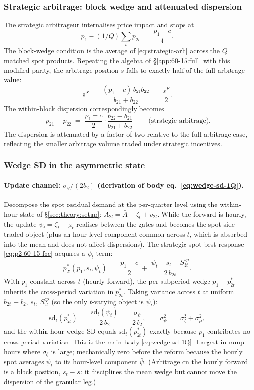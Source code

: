 \documentclass[11pt,a4paper]{article}
\theoremstyle{definition}
\theoremstyle{remark}
\theoremstyle{plain}
\begin{document}
\subsubsection{Strategic arbitrage: block wedge and attenuated dispersion}\label{app:60-15:strategic}
The strategic arbitrageur internalises price impact and stops at
\[
p_1 - (1/Q)\sum_t p_{2t} \;=\; \frac{p_1 - c}{4}.
\]
The block-wedge condition is the average of \eqref{eq:strategic-arb} across the $Q$ matched spot products. Repeating the algebra of \S\ref{app:60-15:full} with this modified parity, the arbitrage position $\bar s$ falls to exactly half of the full-arbitrage value:
\[
\bar s^{S} \;=\; \frac{(p_1 - c)\, b_{21} b_{22}}{b_{21} + b_{22}} \;=\; \frac{\bar s^{F}}{2}.
\]
The within-block dispersion correspondingly becomes
\begin{equation}
\boxed{\;p_{21} - p_{22} \;=\; \frac{p_1 - c}{2}\cdot\frac{b_{22} - b_{21}}{b_{21} + b_{22}}\;}\qquad\text{(strategic arbitrage)}.
\label{eq:within-block-strategic}
\end{equation}
The dispersion is attenuated by a factor of two relative to the full-arbitrage case, reflecting the smaller arbitrage volume traded under strategic incentives.

\subsubsection{Wedge SD in the asymmetric state}\label{app:60-15:wedgesd}

\paragraph{Update channel: $\sigma_\psi/(2 b_2)$ (derivation of body eq.~\ref{eq:wedge-sd-1Q}).} Decompose the spot residual demand at the per-quarter level using the within-hour state of \S\ref{sec:theory:setup}: $A_{2t} = \bar A + \zeta_t + v_{2t}$. While the forward is hourly, the update $\psi_t = \zeta_t + \mu_t$ realises between the gates and becomes the spot-side traded object (plus an hour-level component common across $t$, which is absorbed into the mean and does not affect dispersions). The strategic spot best response \eqref{eq:p2-60-15-foc} acquires a $\psi_t$ term:
\[
p_{2t}^*(p_1, s_t, \psi_t) \;=\; \frac{p_1 + c}{2} \;+\; \frac{\psi_t + s_t - S^{op}_{2t}}{2\, b_{2t}}.
\]
With $p_1$ constant across $t$ (hourly forward), the per-subperiod wedge $p_1 - p_{2t}^*$ inherits the cross-period variation in $p_{2t}^*$. Taking variance across $t$ at uniform $b_{2t} \equiv b_2$, $s_t$, $S^{op}_{2t}$ (so the only $t$-varying object is $\psi_t$):
\[
\mathrm{sd}_t(p_{2t}^*) \;=\; \frac{\mathrm{sd}_t(\psi_t)}{2\, b_2} \;=\; \frac{\sigma_\psi}{2\, b_2}, \qquad \sigma_\psi^2 \;=\; \sigma_\zeta^2 + \sigma_\mu^2,
\]
and the within-hour wedge SD equals $\mathrm{sd}_t(p_{2t}^*)$ exactly because $p_1$ contributes no cross-period variation. This is the main-body \eqref{eq:wedge-sd-1Q}. Largest in ramp hours where $\sigma_\zeta$ is large; mechanically zero before the reform because the hourly spot averages $\psi_t$ to its hour-level component $\bar\psi$. (Arbitrage on the hourly forward is a block position, $s_t \equiv \bar s$: it disciplines the mean wedge but cannot move the dispersion of the granular leg.)
\end{document}
